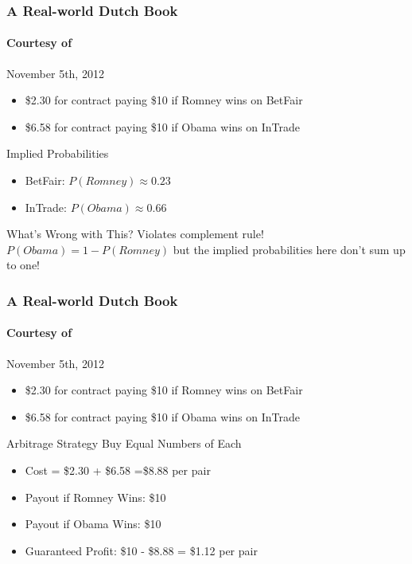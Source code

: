 \begin{frame}
\frametitle{A Real-world Dutch Book}
\framesubtitle{Courtesy of  }

\begin{block}{November 5th, 2012}
	\begin{itemize}
		\item\$2.30 for contract paying \$10 if Romney wins on BetFair
		\item \$6.58 for contract paying \$10 if Obama wins on InTrade
	\end{itemize}
\end{block}

\begin{block}{Implied Probabilities}
	\begin{itemize}
	\item BetFair: $P(Romney) \approx 0.23$
	\item InTrade: $P(Obama) \approx 0.66$
	\end{itemize}
\end{block}

\begin{alertblock}{What's Wrong with This?}\pause
 Violates complement rule! $P(Obama) = 1 - P(Romney)$ but the implied probabilities here don't sum up to one!
\end{alertblock}



\end{frame}

\begin{frame}
\frametitle{A Real-world Dutch Book}
\framesubtitle{Courtesy of  }

\begin{block}{November 5th, 2012}
	\begin{itemize}
		\item\$2.30 for contract paying \$10 if Romney wins on BetFair
		\item \$6.58 for contract paying \$10 if Obama wins on InTrade
	\end{itemize}
\end{block}

\begin{alertblock}{Arbitrage Strategy}
Buy Equal Numbers of Each 
	\begin{itemize}
		\item Cost = \$2.30 + \$6.58 =\$8.88 per pair 
		\item Payout if Romney Wins: \$10 
		\item Payout if Obama Wins: \$10
		\item Guaranteed Profit: \$10 - \$8.88 = \$1.12 per pair
	\end{itemize} 

\end{alertblock}



\end{frame}
